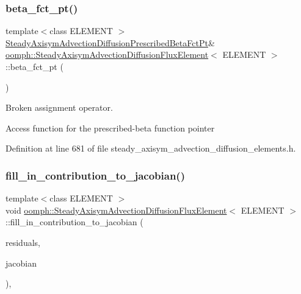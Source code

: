 \subsubsection{\texorpdfstring{beta\+\_\+fct\+\_\+pt()}{beta\_fct\_pt()}}
{\footnotesize\ttfamily template$<$class E\+L\+E\+M\+E\+NT $>$ \\
\hyperlink{classoomph_1_1SteadyAxisymAdvectionDiffusionFluxElement_acaec4345326b85f4689043efd2cd1e1c}{Steady\+Axisym\+Advection\+Diffusion\+Prescribed\+Beta\+Fct\+Pt}\& \hyperlink{classoomph_1_1SteadyAxisymAdvectionDiffusionFluxElement}{oomph\+::\+Steady\+Axisym\+Advection\+Diffusion\+Flux\+Element}$<$ E\+L\+E\+M\+E\+NT $>$\+::beta\+\_\+fct\+\_\+pt (\begin{DoxyParamCaption}{ }\end{DoxyParamCaption})\hspace{0.3cm}{\ttfamily [inline]}}



Broken assignment operator. 

Access function for the prescribed-\/beta function pointer 

Definition at line 681 of file steady\+\_\+axisym\+\_\+advection\+\_\+diffusion\+\_\+elements.\+h.

\mbox{\label{classoomph_1_1SteadyAxisymAdvectionDiffusionFluxElement_aa23b0478cb2937ac6e0668136befac27}} 
\subsubsection{\texorpdfstring{fill\+\_\+in\+\_\+contribution\+\_\+to\+\_\+jacobian()}{fill\_in\_contribution\_to\_jacobian()}}
{\footnotesize\ttfamily template$<$class E\+L\+E\+M\+E\+NT $>$ \\
void \hyperlink{classoomph_1_1SteadyAxisymAdvectionDiffusionFluxElement}{oomph\+::\+Steady\+Axisym\+Advection\+Diffusion\+Flux\+Element}$<$ E\+L\+E\+M\+E\+NT $>$\+::fill\+\_\+in\+\_\+contribution\+\_\+to\+\_\+jacobian (\begin{DoxyParamCaption}\item[{\hyperlink{classoomph_1_1Vector}{Vector}$<$ double $>$ \&}]{residuals,  }\item[{\hyperlink{classoomph_1_1DenseMatrix}{Dense\+Matrix}$<$ double $>$ \&}]{jacobian }\end{DoxyParamCaption})\hspace{0.3cm}{\ttfamily [inline]}, {\ttfamily [virtual]}}



